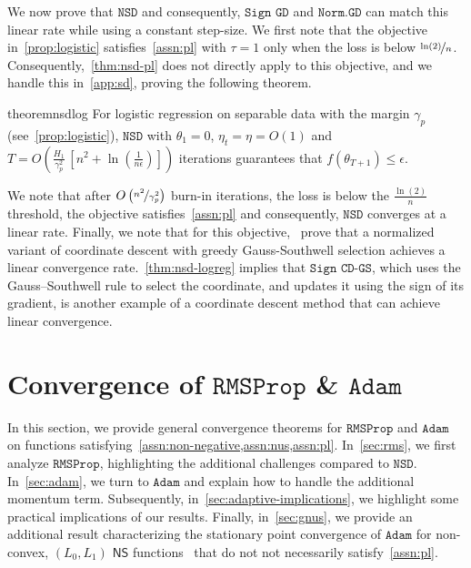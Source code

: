 \documentclass{article}
\newcommand{\etat}{{\eta_t}}
\newcommand{\NSD}{\texttt{NSD}}
\newcommand{\NormGD}{\texttt{Norm.GD}}
\newcommand{\SignGD}{\texttt{Sign GD}}
\newcommand{\SignCD}{\texttt{Sign CD-GS}}
\newcommand{\RMS}{\texttt{RMSProp}}
\newcommand{\Adam}{\texttt{Adam}}
\newcommand{\NS}{\textsf{NS}}
\begin{document}
We now prove that $\NSD$ and consequently, $\SignGD$ and $\NormGD$ can match this linear rate while using a constant step-size. We first note that the objective in~\cref{prop:logistic} satisfies~\cref{assn:pl} with $\tau = 1$ only when the loss is below $\nicefrac{\ln(2)}{n}$. Consequently,~\cref{thm:nsd-pl} does not directly apply to this objective, and we handle this in~\cref{app:sd},  proving the following theorem.  
\begin{restatable}{theorem}{nsdlog}
For logistic regression on separable data with the margin $\gamma_p$ (see~\cref{prop:logistic}), $\NSD$ with $\theta_1 = 0$, $\etat = \eta = O(1)$ and $T = O\left(\frac{H_1}{\gamma_p^2} \, \left[n^2 + \ln\left(\frac{1}{n \epsilon}\right)\right]\right)$ iterations guarantees that  $f(\theta_{T+1}) \leq \epsilon$. 
\label{thm:nsd-logreg}
\end{restatable}
We note that after $O\left(\nicefrac{n^2}{\gamma_p^2}\right)$ burn-in iterations, the loss is below the $\frac{\ln(2)}{n}$ threshold, the objective satisfies~\cref{assn:pl} and consequently, $\NSD$ converges at a linear rate. Finally, we note that for this objective,~\citet{axiotis2023gradient} prove that a normalized variant of coordinate descent with greedy Gauss-Southwell selection achieves a linear convergence rate.~\cref{thm:nsd-logreg} implies that $\SignCD$, which uses the Gauss–Southwell rule to select the coordinate, and updates it using the sign of its gradient, is another example of a coordinate descent method that can achieve linear convergence. 
\section{Convergence of $\RMS$ \& $\Adam$}
\label{sec:adaptive}
In this section, we provide general convergence theorems for $\RMS$ and $\Adam$ on functions satisfying~\cref{assn:non-negative,assn:nus,assn:pl}. In~\cref{sec:rms}, we first analyze $\RMS$, highlighting the additional challenges compared to $\NSD$. In~\cref{sec:adam}, we turn to $\Adam$ and explain how to handle the additional momentum term. Subsequently, in~\cref{sec:adaptive-implications}, we highlight some practical implications of our results. Finally, in~\cref{sec:gnus}, we provide an additional result characterizing the stationary point convergence of $\Adam$ for non-convex, $(L_0, L_1)$ $\NS$ functions~\citep{zhang2019gradient} that do not not necessarily satisfy~\cref{assn:pl}. 
\end{document}
